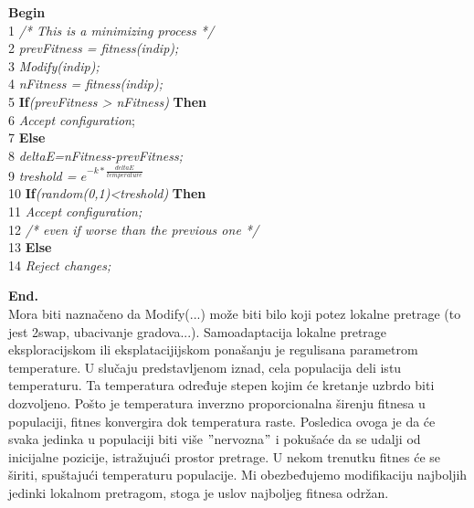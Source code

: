 \documentclass[a4paper]{article}
\begin{document}
\textbf{Begin} \\
1\hspace{0.5cm}  \textit{ /* This is a minimizing process */ } \\
2\hspace{0.5cm} \textit{{ prevFitness = fitness(indip);}} \\
3\hspace{0.5cm}\textit{ Modify(indip);}  \\
4\hspace{0.5cm} \textit{nFitness = fitness(indip);} \\
5 \hspace{0.5cm}\textbf{If}\textit{(prevFitness > nFitness)} \textbf{Then} \\
6  \hspace{1cm} \textit{Accept configuration}; \\
7 \hspace{0.5cm}\textbf{Else} \\
8\hspace{1cm}\textit{  deltaE=nFitness-prevFitness;} \\
9 \hspace{1cm} \textit{ treshold = $e^{-k*\frac{deltaE}{temperature}}$} \\
10 \hspace{1cm} \textbf{If}\textit{(random(0,1)<treshold)} \textbf{Then} \\
11\hspace{1.5cm} \textit{ Accept configuration;} \\
12 \hspace{1.5cm}   \textit{/* even if worse than the previous one */ } \\
13 \hspace{1cm} \textbf{ Else} \\
14 \hspace{1.5cm}  \textit{ Reject changes;} 

\textbf{End.} \\


Mora biti naznačeno da Modify(...) može biti bilo koji potez lokalne pretrage (to jest 2swap, ubacivanje gradova...). Samoadaptacija lokalne pretrage eksploracijskom ili eksplatacijijskom ponašanju je regulisana parametrom temperature. U slučaju predstavljenom iznad, cela populacija deli istu temperaturu. Ta temperatura određuje stepen kojim će kretanje uzbrdo biti dozvoljeno. Pošto je temperatura inverzno proporcionalna širenju fitnesa u populaciji, fitnes konvergira dok temperatura raste. Posledica ovoga je da će svaka jedinka u populaciji biti više $"$nervozna$"$ i pokušaće da se udalji od inicijalne pozicije, istražujući prostor pretrage. U nekom trenutku fitnes će se širiti, spuštajući temperaturu populacije. Mi obezbeđujemo modifikaciju najboljih jedinki lokalnom pretragom, stoga je uslov najboljeg fitnesa održan.  
\end{document}
